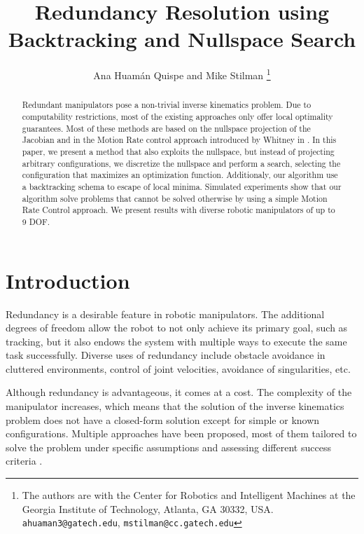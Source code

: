 \documentclass[conference]{IEEEtran}
\begin{document}
\title{Redundancy Resolution using Backtracking and Nullspace Search}
\author{Ana Huam\'an Quispe and Mike Stilman%
  \thanks{The authors are with the Center for Robotics and Intelligent
    Machines at the Georgia Institute of Technology, Atlanta, GA
    30332, USA. {\tt\small ahuaman3@gatech.edu}, {\tt\small mstilman@cc.gatech.edu}}}
\maketitle

\begin{abstract}
Redundant manipulators pose a non-trivial inverse kinematics problem.
Due to computability restrictions, most of the existing approaches only offer
local optimality guarantees. Most of these methods are based on the nullspace 
projection of the Jacobian and in the Motion Rate control approach introduced 
by Whitney in \cite{Whitney-motionRate-1969}. In this paper, we present a method that also exploits
the nullspace, but instead of projecting arbitrary configurations, we discretize
the nullspace and perform a search, selecting the configuration that maximizes
an optimization function. Additionaly, our algorithm use a backtracking schema 
to escape of local minima. Simulated experiments show that our algorithm solve
problems that cannot be solved otherwise by using a simple Motion Rate Control approach.
We present results with diverse robotic manipulators of up to 9 DOF.  
\end{abstract}

\section{Introduction}
Redundancy is a desirable feature in robotic manipulators. The 
additional degrees of freedom allow the robot to not only achieve
its primary goal, such as tracking, but 
it also endows the system with multiple ways to execute the same 
task successfully. Diverse uses of redundancy include obstacle 
avoidance in cluttered environments, control of joint velocities,
avoidance of singularities, etc.

Although redundancy is advantageous, it comes at a
 cost. The complexity of the manipulator increases, which means
that the solution of the inverse kinematics problem does not have
a closed-form solution except for simple or known configurations.
Multiple approaches have been proposed, most of them tailored to
solve the problem under specific assumptions and assessing different
success criteria \cite{hooper-ns-1995}. 
\end{document}
